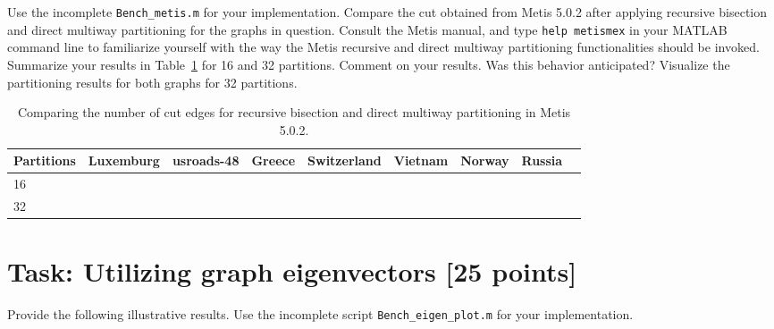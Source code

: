 \documentclass[unicode,11pt,a4paper,oneside,numbers=endperiod,openany]{scrartcl}
\begin{document}
Use the incomplete \texttt{Bench\_metis.m} for your implementation. Compare the cut obtained from Metis 5.0.2 after applying recursive bisection and direct multiway partitioning for the graphs in question. Consult the Metis manual, and type \texttt{help metismex} in your MATLAB command line to familiarize yourself with the way the Metis recursive and direct multiway partitioning functionalities should be invoked. Summarize your results in Table~\ref{table:Compare_Metis} for 16 and 32 partitions. Comment on your results. Was this behavior anticipated? Visualize the partitioning results for both graphs for 32 partitions.

\begin{table}[h]
\caption{Comparing the number of cut edges for recursive bisection and direct multiway partitioning in Metis 5.0.2.}
\centering
\begin{tabular}{l|r|r|r|r|r|r|r|r} \hline\hline 
Partitions       &   Luxemburg           & usroads-48 &  Greece &  Switzerland &  Vietnam  &  Norway &  Russia  \\ \hline
 16              &                       &            &         &              &           &         &          \\             
 32              &                       &            &         &              &           &         &          \\ \hline \hline
\end{tabular}              
\label{table:Compare_Metis}
\end{table}




\section{Task: Utilizing graph eigenvectors [25 points]}


Provide the following illustrative results. Use the incomplete script \texttt{Bench\_eigen\_plot.m} for your implementation.
\end{document}
